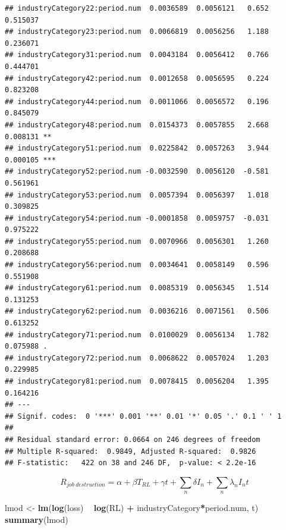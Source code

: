 \documentclass[
]{article}
\newenvironment{Shaded}{\begin{snugshade}}{\end{snugshade}}
\newcommand{\KeywordTok}[1]{\textcolor[rgb]{0.13,0.29,0.53}{\textbf{#1}}}
\newcommand{\NormalTok}[1]{#1}
\newcommand{\OperatorTok}[1]{\textcolor[rgb]{0.81,0.36,0.00}{\textbf{#1}}}
\newcommand{\StringTok}[1]{\textcolor[rgb]{0.31,0.60,0.02}{#1}}
\begin{document}
\begin{verbatim}
## industryCategory22:period.num  0.0036589  0.0056121   0.652 0.515037    
## industryCategory23:period.num  0.0066819  0.0056256   1.188 0.236071    
## industryCategory31:period.num  0.0043184  0.0056412   0.766 0.444701    
## industryCategory42:period.num  0.0012658  0.0056595   0.224 0.823208    
## industryCategory44:period.num  0.0011066  0.0056572   0.196 0.845079    
## industryCategory48:period.num  0.0154373  0.0057855   2.668 0.008131 ** 
## industryCategory51:period.num  0.0225842  0.0057263   3.944 0.000105 ***
## industryCategory52:period.num -0.0032590  0.0056120  -0.581 0.561961    
## industryCategory53:period.num  0.0057394  0.0056397   1.018 0.309825    
## industryCategory54:period.num -0.0001858  0.0059757  -0.031 0.975222    
## industryCategory55:period.num  0.0070966  0.0056301   1.260 0.208688    
## industryCategory56:period.num  0.0034641  0.0058149   0.596 0.551908    
## industryCategory61:period.num  0.0085319  0.0056345   1.514 0.131253    
## industryCategory62:period.num  0.0036216  0.0071561   0.506 0.613252    
## industryCategory71:period.num  0.0100029  0.0056134   1.782 0.075988 .  
## industryCategory72:period.num  0.0068622  0.0057024   1.203 0.229985    
## industryCategory81:period.num  0.0078415  0.0056204   1.395 0.164216    
## ---
## Signif. codes:  0 '***' 0.001 '**' 0.01 '*' 0.05 '.' 0.1 ' ' 1
## 
## Residual standard error: 0.0664 on 246 degrees of freedom
## Multiple R-squared:  0.9849, Adjusted R-squared:  0.9826 
## F-statistic:   422 on 38 and 246 DF,  p-value: < 2.2e-16
\end{verbatim}

\[R_{job \ destruction} = \alpha + \beta T_{RL} + \gamma t + \sum_n \delta I_n + \sum_n \lambda_n I_n t\]

\begin{Shaded}
\begin{Highlighting}[]
\NormalTok{lmod <-}\StringTok{ }\KeywordTok{lm}\NormalTok{(}\KeywordTok{log}\NormalTok{(loss) }\OperatorTok{~}\StringTok{ }\KeywordTok{log}\NormalTok{(RL) }\OperatorTok{+}\StringTok{ }\NormalTok{industryCategory}\OperatorTok{*}\NormalTok{period.num, t)}
\KeywordTok{summary}\NormalTok{(lmod)}
\end{Highlighting}
\end{Shaded}
\end{document}
